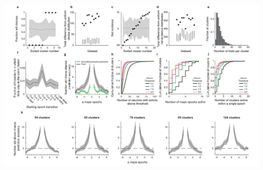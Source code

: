 \begin{FPfigure}
\includegraphics[width=1.1\textwidth,center]{figures/fig_3_7.pdf}
\caption[Characterization of behavioral and neuronal patterns across clusters.]
{\textbf{Characterization of behavioral and neuronal patterns across clusters. a,} Fraction of trials in each cluster in the turn epoch that were left choice trials for an example dataset. Clustering revealed neuronal activity patterns related to behavioral choices. Gray area indicates the median and 99\% confidence intervals of the shuffled distribution of trial assignments to clusters.  
%
\textbf{b,} Comparison of the total difference from a uniform distribution for the real data (circles) to the 99\% confidence intervals of the corresponding shuffle for each dataset (lines). The total difference was calculated as the summed absolute difference from the shuffle median across clusters.
%
\textbf{c-d,} Same as in \textbf{a-b,} but for net evidence during the fifth cue. 
%
\textbf{e,} Distribution of trials per cluster across all epochs and datasets (n = 2457 clusters). 
%
\textbf{f,} Cluster self-transition probabilities for clustering performed using all epochs together. Transition probabilities were considered from one epoch to the next epoch. Low self-transition probabilities suggested that activity patterns changed over the time of consecutive epochs. Error bars represent mean $\pm$ s.e.m across datasets. 
%
\textbf{g,} Based on the cluster identity for a trial at a given epoch, the accuracy of predicting the clusters that trial occupied in the past and future. Real data are shown in black and a simulated pseudo-population is shown in green. To create the pseudo-population, trial identities were shuffled independently for each neuron to break neuron-neuron correlation structure but to preserve each neuron's activity within the trial (Methods \ref{methods:clustering_pseudopop}). Error bars represent mean $\pm$ s.e.m. across datasets. 
}
\end{FPfigure}
